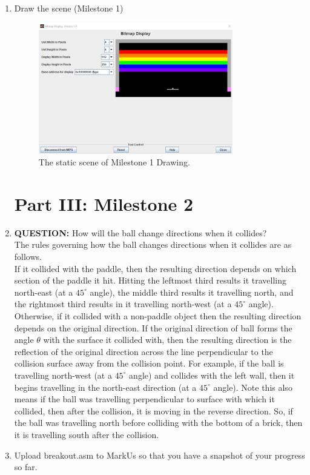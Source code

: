 \documentclass{article}
\begin{document}
\begin{enumerate}
\item Draw the scene (Milestone 1)

\begin{figure}[ht!]
    \centering
    \includegraphics[width=0.8\textwidth]{milestone1_drawing.png}
    \caption{The static scene of Milestone 1 Drawing.}
    \label{f:milestone1_drawing}
\end{figure}

\section{Part III: Milestone 2}

\item \textbf{QUESTION: } How will the ball change directions when it collides? \\[0.4em]
The rules governing how the ball changes directions when it collides are as follows. \\[0.4em]
If it collided with the paddle, then the resulting direction depends on which section of the paddle it hit.
Hitting the leftmost third results it travelling north-east (at a $45^\circ$ angle), the middle third results it travelling north, and the rightmost third results in it travelling north-west (at a $45^\circ$ angle). \\[0.4em]
Otherwise, if it collided with a non-paddle object then the resulting direction depends on the original direction.
If the original direction of ball forms the angle $\theta$ with the surface it collided with, 
then the resulting direction is the reflection of the original direction across the line perpendicular to the collision surface away from the collision point.
For example, if the ball is travelling north-west (at a $45^\circ$ angle) and collides with the left wall, then it begins travelling in the north-east direction (at a $45^\circ$ angle).
Note this also means if the ball was travelling perpendicular to surface with which it collided, then after the collision, it is moving in the reverse direction.
So, if the ball was travelling north before colliding with the bottom of a brick, then it is travelling south after the collision.
\item Upload breakout.asm to MarkUs so that you have a snapshot of your progress so far.


\end{enumerate}
\end{document}
